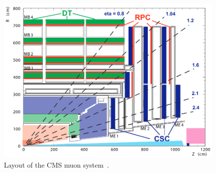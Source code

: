 \begin{figure}
\centering
\includegraphics[scale=0.4]{figures/lhc_and_cms/muon_system_layout.png}
\caption{Layout of the CMS muon system~\cite{cms_tdr_v1}.}
\label{muon_system_layout}
\end{figure}